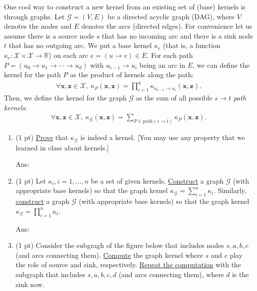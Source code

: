 \documentclass[10pt,letter,notitlepage]{article}
\newcommand{\xv}{\mathbf{x}}
\newcommand{\zv}{\mathbf{z}}
\newcommand{\ans}[1]{{\color{blue}\textsf{Ans}: #1}}
\begin{document}
	\begin{exercise}
		One cool way to construct a new kernel from an existing set of (base) kernels is through graphs. Let $\mathcal{G} = (V, E)$ be a directed acyclic graph (DAG), where $V$ denotes the nodes and $E$ denotes the arcs (directed edges). For convenience let us assume there is a source node $s$ that has no incoming arc and there is a sink node $t$ that has no outgoing arc. We put a base kernel $\kappa_e$ (that is, a function $\kappa_e: \mathcal{X} \times \mathcal{X} \to \mathds{R}$) on each arc $e = (u \to v) \in E$. For each path $P = (u_0 \to u_1 \to \cdots \to u_d)$ with $u_{i-1} \to u_i$ being an arc in $E$, we can define the kernel for the path $P$ as the product of kernels along the path:
		\begin{align}
		\forall \xv, \zv \in \mathcal{X},~
		\kappa_P(\xv, \zv) = \prod_{i=1}^d \kappa_{u_{i-1}\to u_i} (\xv, \zv).
		\end{align}
		Then, we define the kernel for the graph $\mathcal{G}$ as the sum of all possible $s\to t$ \emph{path kernels}:
		\begin{align}
		\forall \xv, \zv \in \mathcal{X},~
		\kappa_{\mathcal{G}}(\xv, \zv) = \sum_{P \in \mathrm{path}(s \to t)} \kappa_P(\xv, \zv).
		\end{align}
		
		\begin{enumerate}
			\item (1 pt) \uline{Prove} that $\kappa_{\mathcal{G}}$ is indeed a kernel. [You may use any property that we learned in class about kernels.]
			
			\ans{\vskip5cm}
			
			\item (1 pt) Let $\kappa_i, i = 1, \ldots, n$ be a set of given kernels. \uline{Construct} a graph $\mathcal{G}$ (with appropriate base kernels) so that the graph kernel $\kappa_{\mathcal{G}} = \sum_{i=1}^n \kappa_i$. Similarly, \uline{construct} a graph $\mathcal{G}$ (with appropriate base kernels) so that the graph kernel $\kappa_{\mathcal{G}} = \prod_{i=1}^n \kappa_i$. 
		
			\ans{\vskip5cm}

			\item (1 pt) Consider the subgragh of the figure below that includes nodes $s, a, b, c$ (and arcs connecting them). \uline{Compute} the graph kernel where $s$ and $c$ play the role of source and sink, respectively. \uline{Repeat the computation} with the subgraph that includes $s, a, b, c, d$ (and arcs connecting them), where $d$ is the sink now.
			

\end{enumerate}
\end{exercise}
\end{document}

